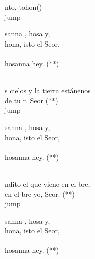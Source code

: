 \begin{cancion}[Santo][Zaireño]%
	nto, tohon()\\jump\\
	\begin{chorus}%
	sanna , hosa y,\\
	hona, isto el Seor,\\
	\jump\\
hosanna hey. (**)\\
	\end{chorus}%
	\jump\\
	s cielos y la tierra estánenos\\
	de tu r. Seor (**)\\jump\\
	\begin{chorus}%
	sanna , hosa y,\\
	hona, isto el Seor,\\
	\jump\\
hosanna hey. (**)\\
	\end{chorus}%
	\jump\\
	ndito el que viene en el bre,\\
	en el bre yo, Seor. (**)\\jump\\
	\begin{chorus}%
	sanna , hosa y,\\
	hona, isto el Seor,\\
	\jump\\
hosanna hey. (**)\\
	\end{chorus}%
	\jump\\
\end{cancion}%
